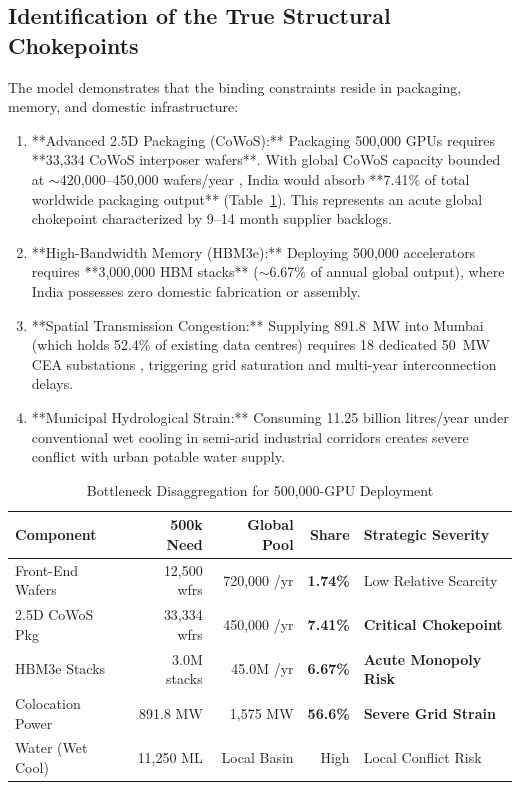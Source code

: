 \documentclass[conference]{IEEEtran}
\begin{document}
\subsection{Identification of the True Structural Chokepoints}
The model demonstrates that the binding constraints reside in packaging, memory, and domestic infrastructure:
\begin{enumerate}
\item **Advanced 2.5D Packaging (CoWoS):** Packaging 500,000 GPUs requires **33,334 CoWoS interposer wafers**. With global CoWoS capacity bounded at $\sim$420,000--450,000 wafers/year \cite{trendforce2025cowos}, India would absorb **7.41\% of total worldwide packaging output** (Table~\ref{tab:chokepoint}). This represents an acute global chokepoint characterized by 9--14 month supplier backlogs.
\item **High-Bandwidth Memory (HBM3e):** Deploying 500,000 accelerators requires **3,000,000 HBM stacks** ($\sim$6.67\% of annual global output), where India possesses zero domestic fabrication or assembly.
\item **Spatial Transmission Congestion:** Supplying 891.8~MW into Mumbai (which holds 52.4\% of existing data centres) requires 18 dedicated 50~MW CEA substations \cite{cea2026transmission}, triggering grid saturation and multi-year interconnection delays.
\item **Municipal Hydrological Strain:** Consuming 11.25 billion litres/year under conventional wet cooling in semi-arid industrial corridors creates severe conflict with urban potable water supply.
\end{enumerate}

\begin{table}[t]
\caption{Bottleneck Disaggregation for 500,000-GPU Deployment}
\label{tab:chokepoint}
\centering
\scriptsize
\begin{tabular}{lrrrl}
\toprule
\textbf{Component} & \textbf{500k Need} & \textbf{Global Pool} & \textbf{Share} & \textbf{Strategic Severity} \\
\midrule
Front-End Wafers & 12,500 wfrs & 720,000 /yr & \textbf{1.74\%} & Low Relative Scarcity \\
2.5D CoWoS Pkg & 33,334 wfrs & 450,000 /yr & \textbf{7.41\%} & \textbf{Critical Chokepoint} \\
HBM3e Stacks & 3.0M stacks & 45.0M /yr & \textbf{6.67\%} & \textbf{Acute Monopoly Risk} \\
Colocation Power & 891.8 MW & 1,575 MW & \textbf{56.6\%} & \textbf{Severe Grid Strain} \\
Water (Wet Cool) & 11,250 ML & Local Basin & High & Local Conflict Risk \\
\bottomrule
\end{tabular}
\end{table}
\end{document}
